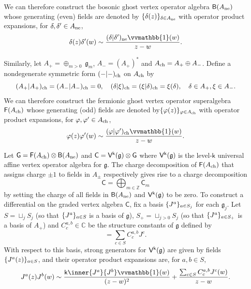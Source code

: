 \documentclass[10pt,a4paper]{amsart}
\numberwithin{equation}{section}
\newcommand{\kk}{\mathsf{k}}   %
\newcommand{\wun}{\vvmathbb{1}}  %
\DeclarePairedDelimiter{\brac}{\lparen}{\rparen}   %
\DeclarePairedDelimiter{\set}{\lbrace}{\rbrace}
\newcommand{\blank}{{-}}
\newcommand{\fld}[1]{\mathbb{#1}}    %
\newcommand{\VOA}[1]{\mathsf{#1}}    %
\newcommand{\ZZ}{\fld{Z}}
\newcommand{\CC}{\fld{C}}
\newcommand{\uaffvoa}[2]{\VOA{V}^{#1}\brac{#2}}                   %
\newcommand{\bgvoa}{\VOA{B}}                                      %
\theoremstyle{plain}
\begin{document}
We can therefore construct the bosonic ghost vertex operator algebra $\bgvoa(A_{\textup{ne}})$ whose generating (even) fields are denoted by $\set{\delta(z)}_{\delta \in A_{\textup{ne}}}$ with operator product expansions, for $\delta, \delta' \in A_{\textup{ne}}$,
%
\begin{equation}
    \delta(z) \delta'(w) \sim \frac{(\delta | \delta' )_{\textup{ne}}\wun(w)}{z-w}.
\end{equation}

Similarly, let $A_+ = \oplus_{m> 0} \ \mathfrak{g}_m$, $A_- = (A_+)^*$ and $A_{\textup{ch}} = A_+ \oplus A_-$. Define a nondegenerate symmetric form $(\blank | \blank)_{\textup{ch}}$ on $A_{\textup{ch}}$ by
%
\begin{equation}
    (A_+ | A_+)_{\textup{ch}} = (A_- | A_-)_{\textup{ch}} = 0, \quad (\delta | \xi)_{\textup{ch}} =  (\xi | \delta)_{\textup{ch}} = \xi(\delta), \quad 
    \delta \in A_+, \xi \in A_-.
\end{equation}
%
We can therefore construct the fermionic ghost vertex operator superalgebra $\VOA{F}(A_{\textup{ch}})$ whose generating (odd) fields are denoted by$\set{\varphi(z)}_{\varphi \in A_{\textup{ch}}}$ with operator product expansions, for $\varphi, \varphi' \in A_{\textup{ch}}$,
%
\begin{equation}
    \varphi(z) \varphi'(w) \sim \frac{(\varphi | \varphi' )_{\textup{ch}}\wun(w)}{z-w}.
\end{equation}

Let $\VOA{G} = \VOA{F}(A_{\textup{ch}}) \otimes \bgvoa(A_{\textup{ne}})$ and $\VOA{C} = \uaffvoa{\kk}{\mathfrak{g}}\otimes \VOA{G}$ where $\uaffvoa{\kk}{\mathfrak{g}}$ is the level-$\kk$ universal affine vertex operator algebra for $\mathfrak{g}$. The charge decomposition of $\VOA{F}(A_{\textup{ch}})$ that assigns charge $\pm 1$ to fields in $A_{\pm}$ respectively gives rise to a charge decomposition
%
\begin{equation}
    \VOA{C} = \bigoplus_{m \in \ZZ} \VOA{C}_m
\end{equation}
%
by setting the charge of all fields in $\bgvoa(A_{\textup{ne}})$ and $\uaffvoa{\kk}{\mathfrak{g}}$ to be zero. To construct a differential on the graded vertex algebra $\VOA{C}$, fix a basis $\set{J^a}_{a \in S_j}$ for each $\mathfrak{g}_j$. Let $S = \sqcup_j S_j$ (so that $\set{J^a}_{a \in S}$ is a basis of $\mathfrak{g}$), $S_+ = \sqcup_{j>0} S_j$ (so that $\set{J^a}_{a \in S_+}$ is a basis of $A_+$) and $C^{a,b}_c \in \CC$ be the structure constants of $\mathfrak{g}$ defined by
%
\begin{equation}
    [J^a,J^b] = \sum_{c \in S} C^{a,b}_c J^c.
\end{equation}
%
With respect to this basis, strong generators for $\uaffvoa{\kk}{\mathfrak{g}}$ are given by fields $\set{J^a(z)}_{a \in S}$, and their operator product expansions are, for $a,b \in S$,
%
\begin{equation} \label{eq:affOPE}
    J^{a}(z) J^{b}(w) \sim \frac{\kk \inner{ J^{a}}{ J^{b}} \wun(w)}{(z-w)^2} + \frac{\sum_{c \in S} C^{a,b}_c J^c(w)}{z-w}. 
\end{equation}
\end{document}

